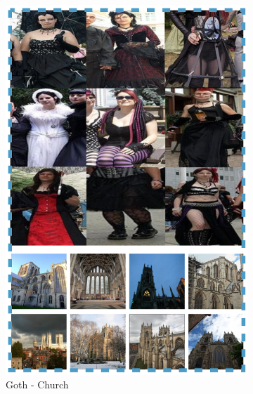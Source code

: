 \documentclass[10pt,twocolumn,letterpaper]{article}
\begin{document}
\begin{figure}[!t]
\begin{center}
\begin{subfigure}[b]{0.2\textwidth}
                \includegraphics[width=\textwidth]{feature3}
                \caption{Goth - Church}
                \label{feature3}
        \end{subfigure}
                \begin{subfigure}[b]{0.2\textwidth}

\end{subfigure}
\end{center}
\end{figure}
\end{document}
